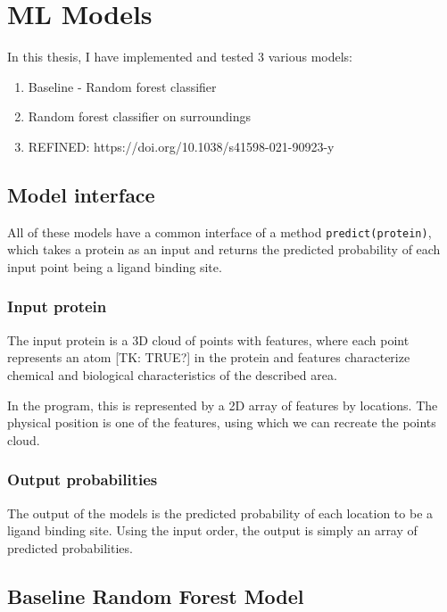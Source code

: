 \chapter{ML Models}

In this thesis, I have implemented and tested 3 various models:
\begin{enumerate}
    \item Baseline - Random forest classifier
    \item Random forest classifier on surroundings
    \item REFINED: https://doi.org/10.1038/s41598-021-90923-y
    
\end{enumerate}

\section{Model interface}

All of these models have a common interface of a method  \texttt{predict(protein)}, which takes a protein as an input and returns the predicted probability of each input point being a ligand binding site.

\subsection{Input protein}

The input protein is a 3D cloud of points with features, where each point represents an atom [TK: TRUE?] in the protein and features characterize chemical and biological characteristics of the described area.

In the program, this is represented by a 2D array of features by locations. The physical position is one of the features, using which we can recreate the points cloud.

\subsection{Output probabilities}

The output of the models is the predicted probability of each location to be a ligand binding site. Using the input order, the output is simply an array of predicted probabilities.

\section{Baseline Random Forest Model}


